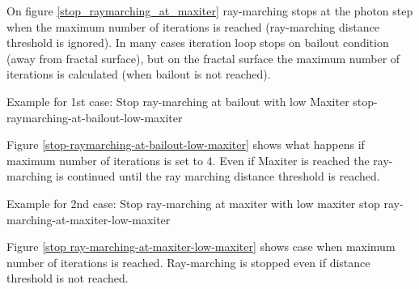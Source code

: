 On figure \ref{stop_raymarching_at_maxiter} ray-marching stops at the photon step when the maximum number of iterations is
reached (ray-marching distance threshold is ignored). In many cases iteration
loop stops on bailout condition (away from fractal surface), but on the fractal
surface the maximum number of iterations is calculated (when bailout is not
reached).

{Example for 1st case: Stop ray-marching at bailout with low Maxiter}
{stop-raymarching-at-bailout-low-maxiter}

Figure \ref{stop-raymarching-at-bailout-low-maxiter} shows what happens if maximum number of iterations is set to 4. Even if Maxiter is reached the
ray-marching is continued until the ray marching distance threshold is reached.

{Example for 2nd case: Stop ray-marching at maxiter with low maxiter}
{stop ray-marching-at-maxiter-low-maxiter}

Figure \ref{stop ray-marching-at-maxiter-low-maxiter} shows case when maximum number of iterations is reached. Ray-marching is stopped even
if distance threshold is not reached.



